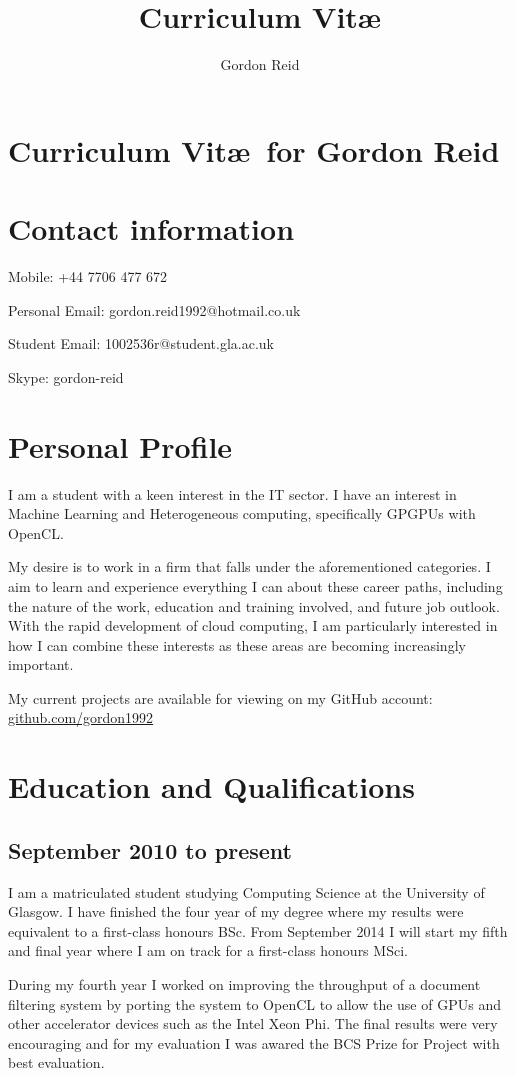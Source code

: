 \documentclass[11pt,a4paper]{article}
\title{Curriculum Vit\ae}
\author{Gordon Reid}
\begin{document}
\section*{Curriculum Vit\ae\ for Gordon Reid}
\section*{Contact information}
Mobile: +44 7706 477 672

Personal Email: gordon.reid1992@hotmail.co.uk

Student Email: 1002536r@student.gla.ac.uk

Skype: gordon-reid

\section*{Personal Profile}

I am a student with a keen interest in the IT sector. I have an interest in
Machine Learning and Heterogeneous computing, specifically GPGPUs with OpenCL.

My desire is to work in a firm that falls under the aforementioned categories. I
aim to learn and experience everything I can about these career paths, including
the nature of the work, education and training involved, and future job outlook.
With the rapid development of cloud computing, I am particularly interested in
how I can combine these interests as these areas are becoming increasingly
important.

My current projects are available for viewing on my GitHub account:
\url{github.com/gordon1992}

\section*{Education and Qualifications}

\subsection*{September 2010 to present}

I am a matriculated student studying Computing Science at the University of
Glasgow. I have finished the four year of my degree where my results were
equivalent to a first-class honours BSc. From September 2014 I will start my
fifth and final year where I am on track for a first-class honours MSci.

During my fourth year I worked on improving the throughput of a document
filtering system by porting the system to OpenCL to allow the use of GPUs and
other accelerator devices such as the Intel Xeon Phi. The final results were
very encouraging and for my evaluation I was awared the BCS Prize for Project
with best evaluation.
\end{document}
